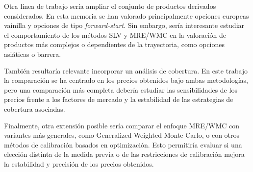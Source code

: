 Otra línea de trabajo sería ampliar el conjunto de productos derivados considerados. En esta memoria se han valorado principalmente opciones europeas vainilla y opciones de tipo \textit{forward-start}. Sin embargo, sería interesante estudiar el comportamiento de los métodos SLV y MRE/WMC en la valoración de productos más complejos o dependientes de la trayectoria, como opciones asiáticas o barrera.\medskip

También resultaría relevante incorporar un análisis de cobertura. En este trabajo la comparación se ha centrado en los precios obtenidos bajo ambas metodologías, pero una comparación más completa debería estudiar las sensibilidades de los precios frente a los factores de mercado y la estabilidad de las estrategias de cobertura asociadas.\medskip

Finalmente, otra extensión posible sería comparar el enfoque MRE/WMC con variantes más generales, como Generalized Weighted Monte Carlo, o con otros métodos de calibración basados en optimización. Esto permitiría evaluar si una elección distinta de la medida previa o de las restricciones de calibración mejora la estabilidad y precisión de los precios obtenidos.




